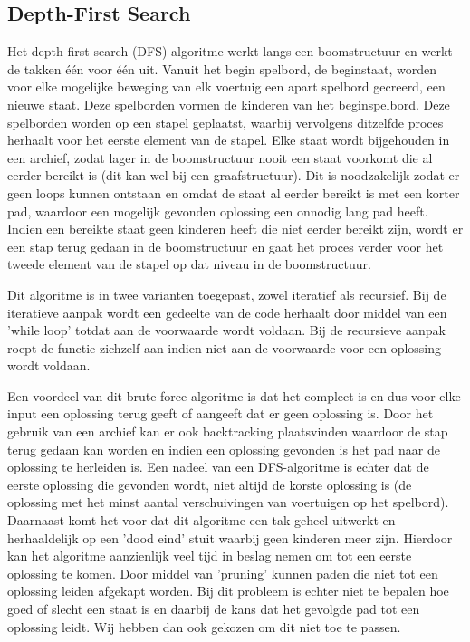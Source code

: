\documentclass[a4paper]{article}
\begin{document}
\subsection{Depth-First Search}
Het depth-first search (DFS) algoritme werkt langs een boomstructuur en werkt de takken één voor één uit. Vanuit het begin spelbord, de beginstaat, worden voor elke mogelijke beweging van elk voertuig een apart spelbord gecreerd, een nieuwe staat. Deze spelborden vormen de kinderen van het beginspelbord. Deze spelborden worden op een stapel geplaatst, waarbij vervolgens ditzelfde proces herhaalt voor het eerste element van de stapel. Elke staat wordt bijgehouden in een archief, zodat lager in de boomstructuur nooit een staat voorkomt die al eerder bereikt is (dit kan wel bij een graafstructuur). Dit is noodzakelijk zodat er geen loops kunnen ontstaan en omdat de staat al eerder bereikt is met een korter pad, waardoor een mogelijk gevonden oplossing een onnodig lang pad heeft. Indien een bereikte staat geen  kinderen heeft die niet eerder bereikt zijn, wordt er een stap terug gedaan in de boomstructuur en gaat het proces verder voor het tweede element van de stapel op dat niveau in de boomstructuur.

	Dit algoritme is in twee varianten toegepast, zowel iteratief als recursief. Bij de iteratieve aanpak wordt een gedeelte van de code herhaalt door middel van een 'while loop' totdat aan de voorwaarde wordt voldaan. Bij de recursieve aanpak roept de functie zichzelf aan indien niet aan de voorwaarde voor een oplossing wordt voldaan. 
    
    Een voordeel van dit brute-force algoritme is dat het compleet is en dus voor elke input een oplossing terug geeft of aangeeft dat er geen oplossing is. Door het gebruik van een archief kan er ook backtracking plaatsvinden waardoor de stap terug gedaan kan worden en indien een oplossing gevonden is het pad naar de oplossing te herleiden is.  Een nadeel van een DFS-algoritme is echter dat de eerste oplossing die gevonden wordt, niet altijd de korste oplossing is (de oplossing met het minst aantal verschuivingen van voertuigen op het spelbord). Daarnaast komt het voor dat dit algoritme een tak geheel uitwerkt en herhaaldelijk op een 'dood eind' stuit waarbij geen kinderen meer zijn. Hierdoor kan het algoritme aanzienlijk veel tijd in beslag nemen om tot een eerste oplossing te komen. Door middel van 'pruning' kunnen paden die niet tot een oplossing leiden afgekapt worden. Bij dit probleem is echter niet te bepalen hoe goed of slecht een staat is en daarbij de kans dat het gevolgde pad tot een oplossing leidt. Wij hebben dan ook gekozen om dit niet toe te passen.
	
\end{document}
